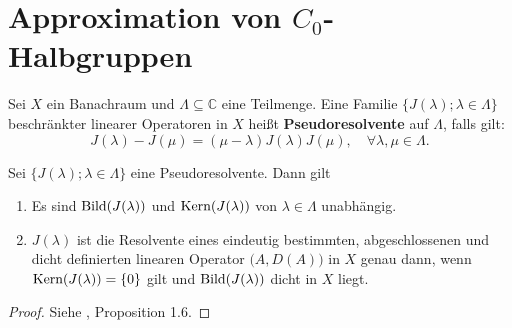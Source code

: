 

\newpage
\section{Approximation von $C_0$-Halbgruppen}

\begin{defi}
 Sei $X$ ein Banachraum und $\Lambda\subseteq\mathbb C$ eine Teilmenge. Eine Familie $\{J(\lambda); \lambda\in\Lambda\}$ beschränkter linearer Operatoren in $X$ heißt \textbf{Pseudoresolvente} auf $\Lambda$, falls gilt:
\begin{equation*}
J(\lambda)-J(\mu)=(\mu-\lambda)J(\lambda)J(\mu),\quad\forall\lambda,\mu\in\Lambda.
\end{equation*}
\end{defi}

\begin{prop}\label{Charakterisierung Pseudoresolvente}
Sei $\{J(\lambda); \lambda\in\Lambda\}$ eine Pseudoresolvente. Dann gilt
\begin{enumerate}
\item Es sind $\textnormal{Bild}(J(\lambda))$ und $\textnormal{Kern}(J(\lambda))$ von $\lambda\in\Lambda$ unabhängig.
\item $J(\lambda)$ ist die Resolvente eines eindeutig bestimmten, abgeschlossenen und dicht definierten linearen Operator $\big(A, D(A)\big)$ in $X$ genau dann, wenn $\textnormal{Kern}(J(\lambda))=\{0\}$  gilt und $\textnormal{Bild}(J(\lambda))$ dicht in $X$ liegt. 
\end{enumerate}
\end{prop}

\begin{proof}
Siehe \cite{engel_nagel_2006}, Proposition 1.6.
\end{proof}

